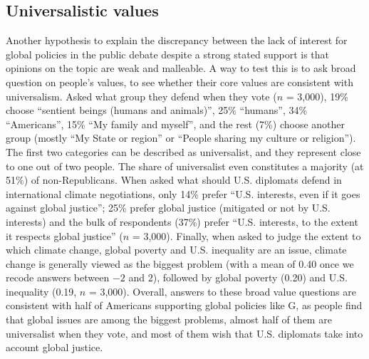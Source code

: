 \documentclass{nature}
\begin{document}
\subsection{Universalistic values}
Another hypothesis to explain the discrepancy between the lack of interest for global policies in the public debate despite a strong stated support is that opinions on the topic are weak and malleable. A way to test this is to ask broad question on people's values, to see whether their core values are consistent with universalism. Asked what group they defend when they vote ($n$ = 3,000), 19\% choose ``sentient beings (humans and animals)'', 25\% ``humans'', 34\% ``Americans'', 15\% ``My family and myself'', and the rest (7\%) choose another group (mostly ``My State or region'' or ``People sharing my culture or religion''). The first two categories can be described as universalist, and they represent close to one out of two people. The share of universalist even constitutes a majority (at 51\%) of non-Republicans. 
When asked what should U.S. diplomats defend in international climate negotiations, only 14\% prefer ``U.S. interests, even if it goes against global justice''; 25\% prefer global justice (mitigated or not by U.S. interests) and the bulk of respondents (37\%) prefer ``U.S. interests, to the extent it respects global justice'' ($n$ = 3,000). 
Finally, when asked to judge the extent to which climate change, global poverty and U.S. inequality are an issue, climate change is generally viewed as the biggest problem (with a mean of 0.40 once we recode answers between $-2$ and $2$), followed by global poverty (0.20) and U.S. inequality (0.19, $n$ = 3,000). 
Overall, answers to these broad value questions are consistent with half of Americans supporting global policies like G, as people find that global issues are among the biggest problems, almost half of them are universalist when they vote, and most of them wish that U.S. diplomats take into account global justice.
\end{document}
